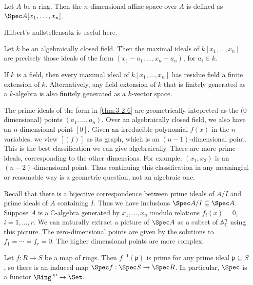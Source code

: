 \begin{definition}\label{dfn:3-2-5}
	Let $A$ be a ring. Then the $n$-dimensional affine space over $A$ is defined as $\Spec A[x_1, \ldots ,x_n]$.
\end{definition}

Hilbert's nullstellensatz is useful here.

\begin{theorem}\label{thm:3-2-6}
	Let $k$ be an algebraically closed field. Then the maximal ideals of $k[x_1, \ldots ,x_n]$ are precisely those ideals of the form $(x_1 - a_1, \ldots ,x_n - a_n)$, for $a_i\in k$.
\end{theorem}
\begin{theorem}\label{thm:3-2-7}
	If $k$ is a field, then every maximal ideal of $k[x_1 ,\ldots ,x_n]$ has residue field a finite extension of $k$. Alternatively, any field extension of $k$ that is finitely generated as a $k$-algebra is also finitely generated as a $k$-vector space.
\end{theorem}

The prime ideals of the form in \cref{thm:3-2-6} are geometrically intepreted as the (0-dimensional) points $(a_1 ,\ldots ,a_n)$. Over an algebraically closed field, we also have an $n$-dimensional point $[0]$. Given an irreducible polynomial $f(x)$ in the $n$-variables, we view $[(f)]$ as its graph, which is an $(n-1)$-dimensional point. This is the best classification we can give algebraically. There are more prime ideals, corresponding to the other dimensions. For example, $(x_1,x_2)$ is an $(n-2)$-dimensional point. Thus continuing this classification in any meaningful or reasonable way is a geometric question, not an algebraic one.

Recall that there is a bijective correspondence between prime ideals of $A/I$ and prime ideals of $A$ containing $I$. Thus we have inclusions $\Spec A/I \subseteq \Spec A$. Suppose $A$ is a $\mathbb{C} $-algebra generated by $x_1, \ldots , x_n$ modulo relations $f_i(x) = 0$, $i = 1, \ldots , r$. We can naturally extract a picture of $\Spec A$ as a subset of $\mathbb{A} _{\mathbb{C} } ^n$ using this picture. The zero-dimensional points are given by the solutions to $f_1 = \cdots = f_r = 0$. The higher dimensional points are more complex.

Let $f : R \to S$ be a map of rings. Then $f^{-1}(\mathfrak{p} )$ is prime for any prime ideal $\mathfrak{p}\subseteq S $, so there is an induced map $\Spec f : \Spec S \to \Spec R$. In particular, $\Spec$ is a functor $\Ring^{\mathrm{op}}\to \Set $. 

